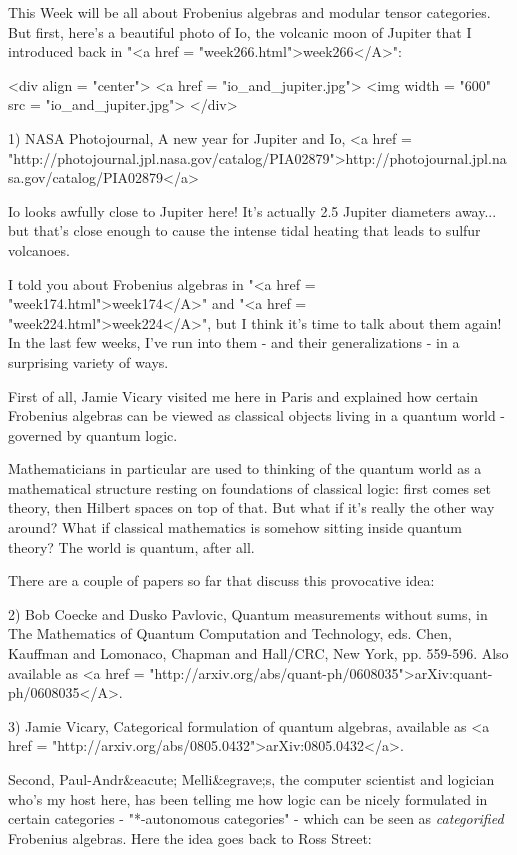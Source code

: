 


This Week will be all about Frobenius algebras and modular tensor
categories.  But first, here's a beautiful photo of Io, the volcanic
moon of Jupiter that I introduced back in "<a href =
"week266.html">week266</A>":

<div align = "center">
<a href = "io_and_jupiter.jpg">
<img width = "600" src = "io_and_jupiter.jpg">
</div>

1) NASA Photojournal, A new year for Jupiter and Io,
<a href = "http://photojournal.jpl.nasa.gov/catalog/PIA02879">http://photojournal.jpl.nasa.gov/catalog/PIA02879</a>

Io looks awfully close to Jupiter here!  It's actually 2.5 Jupiter 
diameters away... but that's close enough to cause the intense 
tidal heating that leads to sulfur volcanoes.

I told you about Frobenius algebras in "<a href =
"week174.html">week174</A>" and "<a href =
"week224.html">week224</A>", but I think it's time to talk about
them again!  In the last few weeks, I've run into them - and their
generalizations - in a surprising variety of ways.

First of all, Jamie Vicary visited me here in Paris and explained 
how certain Frobenius algebras can be viewed as classical objects 
living in a quantum world - governed by quantum logic.  

Mathematicians in particular are used to thinking of the quantum 
world as a mathematical structure resting on foundations of classical 
logic: first comes set theory, then Hilbert spaces on top of that.  
But what if it's really the other way around?  What if classical 
mathematics is somehow sitting inside quantum theory?   The world
is quantum, after all.

There are a couple of papers so far that discuss this provocative 
idea:

2) Bob Coecke and Dusko Pavlovic, Quantum measurements without
sums, in The Mathematics of Quantum Computation and 
Technology, eds. Chen, Kauffman and Lomonaco,  Chapman and Hall/CRC, 
New York, pp. 559-596.  Also available as
<a href = "http://arxiv.org/abs/quant-ph/0608035">arXiv:quant-ph/0608035</A>.

3) Jamie Vicary, Categorical formulation of quantum algebras,
available as <a href = "http://arxiv.org/abs/0805.0432">arXiv:0805.0432</a>.


Second, Paul-Andr&eacute; Melli&egrave;s, the computer scientist and logician
who's my host here, has been telling me how logic can be nicely
formulated in certain categories - "*-autonomous categories"
- which can be seen as \emph{categorified} Frobenius algebras.  Here
the idea goes back to Ross Street:

